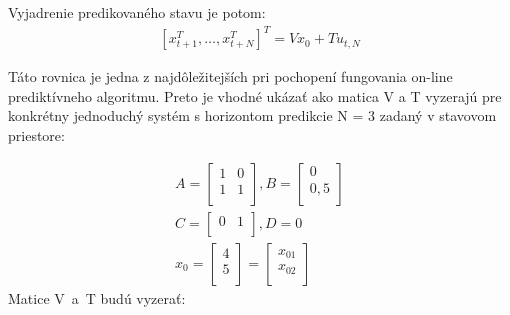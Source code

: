Vyjadrenie predikovaného stavu je potom:
\begin{equation} \label{eq6}
\begin{split}
[ x_{t+1}^T,…,x_{t+N}^T  ]^T=Vx_0+Tu_{t,N}
\end{split}
\end{equation}

Táto rovnica je jedna z najdôležitejších pri pochopení fungovania on-line prediktívneho algoritmu. Preto je vhodné ukázať ako matica V a T vyzerajú pre konkrétny jednoduchý systém s horizontom predikcie N = 3 zadaný v stavovom priestore:

\begin{equation} \label{eq7}
\begin{split}
A = \begin{bmatrix}
1 & 0 \\
1 & 1 \\
\end{bmatrix}, 
B = \begin{bmatrix}
0 \\
0,5 \\
\end{bmatrix} \\
C = \begin{bmatrix}
0 & 1 \\
\end{bmatrix}, D = 0 \\
x_{0} = \begin{bmatrix}
4 \\
5 \\
\end{bmatrix} = \begin{bmatrix}
x_{01} \\
x_{02} \\
\end{bmatrix}
\end{split}
\end{equation}
Matice V~a~T budú vyzerať:
